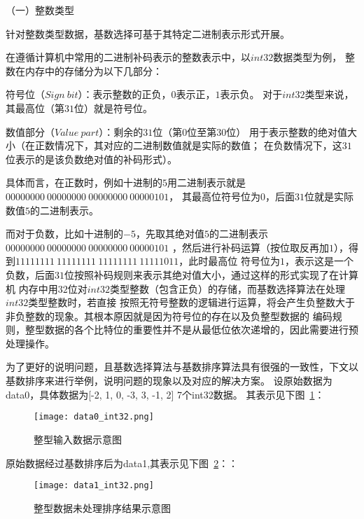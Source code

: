 （一）整数类型

针对整数类型数据，基数选择可基于其特定二进制表示形式开展。

在遵循计算机中常用的二进制补码表示的整数表示中，以\(int32\)数据类型为例，
整数在内存中的存储分为以下几部分：

符号位（\(Sign\ bit\)）：表示整数的正负，\(0\)表示正，\(1\)表示负。
对于\(int32\)类型来说，其最高位（第\(31\)位）就是符号位。

数值部分（\(Value\ part\)）：剩余的\(31\)位（第\(0\)位至第\(30\)位）
用于表示整数的绝对值大小（在正数情况下，其对应的二进制数值就是实际的数值；
在负数情况下，这\(31\)位表示的是该负数绝对值的补码形式）。

具体而言，在正数时，例如十进制的\(5\)用二进制表示就是\(00000000\ 00000000\ 00000000\ 00000101\)，
其最高位符号位为\(0\)，后面\(31\)位就是实际数值\(5\)的二进制表示。

而对于负数，比如十进制的\(-5\)，先取其绝对值\(5\)的二进制表示\(00000000\ 00000000\ 00000000\ 00000101\)
，然后进行补码运算（按位取反再加\(1\)），得到\(11111111\ 11111111\ 11111111\ 11111011\)，此时最高位
符号位为\(1\)，表示这是一个负数，后面\(31\)位按照补码规则来表示其绝对值大小，通过这样的形式实现了在计算机
内存中用\(32\)位对\(int32\)类型整数（包含正负）的存储，而基数选择算法在处理\(int32\)类型整数时，若直接
按照无符号整数的逻辑进行运算，将会产生负整数大于非负整数的现象。其根本原因就是因为符号位的存在以及负整型数据的
编码规则，整型数据的各个比特位的重要性并不是从最低位依次递增的，因此需要进行预处理操作。

为了更好的说明问题，且基数选择算法与基数排序算法具有很强的一致性，下文以基数排序来进行举例，说明问题的现象以及对应的解决方案。
设原始数据为data0，具体数据为[-2, 1, 0,  -3, 3, -1, 2]  7个int32数据。
其表示见下图~\ref{fig:data0_int32}：

\begin{figure}[ht]
    \centering
    \texttt{[image: data0\_int32.png]}
    \caption{整型输入数据示意图}
    \label{fig:data0_int32}
\end{figure}


原始数据经过基数排序后为data1,其表示见下图~\ref{fig:data1_int32}：：

\begin{figure}[ht]
    \centering
    \texttt{[image: data1\_int32.png]}
    \caption{整型数据未处理排序结果示意图}
    \label{fig:data1_int32}
\end{figure}


